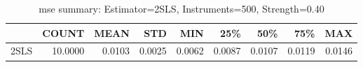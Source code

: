 \begin{table}[ht]
\centering
\caption{mse summary: Estimator=2SLS, Instruments=500, Strength=0.40}
\begin{tabular}{lrrrrrrrr}
\toprule
 & COUNT & MEAN & STD & MIN & 25\% & 50\% & 75\% & MAX \\
\midrule
2SLS & 10.0000 & 0.0103 & 0.0025 & 0.0062 & 0.0087 & 0.0107 & 0.0119 & 0.0146 \\
\bottomrule
\end{tabular}
\end{table}
